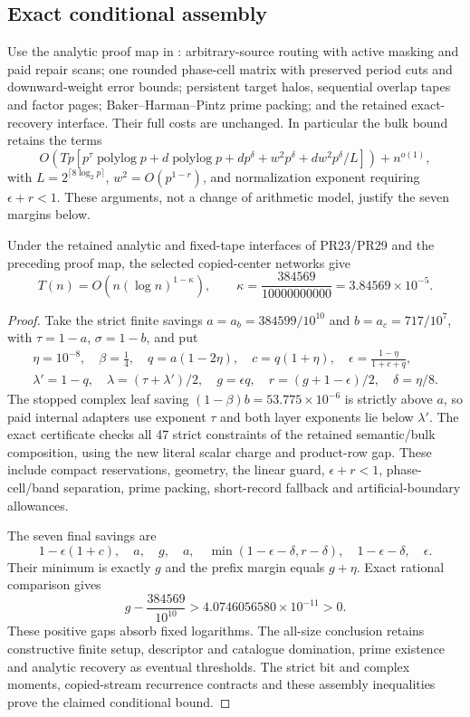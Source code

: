 \subsection{Exact conditional assembly}
Use the analytic proof map in
: arbitrary-source routing
with active masking and paid repair scans; one rounded phase-cell
matrix with preserved period cuts and downward-weight error bounds;
persistent target halos, sequential overlap tapes and factor pages;
Baker--Harman--Pintz prime packing; and the retained exact-recovery
interface. Their full costs are unchanged. In particular the bulk
bound retains the terms
\[
 O\!\left(Tp\left[p^\tau\operatorname{polylog}p+
 d\operatorname{polylog}p+dp^\delta+w^2p^\delta+
 dw^2p^\delta/L\right]\right)+n^{o(1)},
\]
with $L=2^{\lceil8\log_2p\rceil}$,
$w^2=O(p^{1-r})$, and normalization exponent requiring
$\epsilon+r<1$. These arguments, not a change of arithmetic model,
justify the seven margins below.

\begin{theorem}
Under the retained analytic and fixed-tape interfaces of PR23/PR29
and the preceding proof map, the selected copied-center networks give
\[
 T(n)=O\!\left(n(\log n)^{1-\kappa}\right),\qquad
 \boxed{\kappa=\frac{384569}{10000000000}=3.84569\times10^{-5}}.
\]
\end{theorem}
\begin{proof}
Take the strict finite savings $a=a_b=384599/10^{10}$ and
$b=a_c=717/10^7$, with $\tau=1-a$, $\sigma=1-b$, and put
\[
\begin{gathered}
 \eta=10^{-8},\quad\beta=\tfrac14,\quad q=a(1-2\eta),\quad
 c=q(1+\eta),\quad\epsilon=\frac{1-\eta}{1+c+q},\\
 \lambda'=1-q,\quad\lambda=(\tau+\lambda')/2,\quad
 g=\epsilon q,\quad r=(g+1-\epsilon)/2,\quad\delta=\eta/8.
\end{gathered}
\]
The stopped complex leaf saving $(1-\beta)b=53.775\times10^{-6}$
is strictly above $a$, so paid internal adapters use exponent $\tau$
and both layer exponents lie below $\lambda'$. The exact certificate
checks all 47 strict constraints of the retained semantic/bulk
composition, using the new literal scalar charge and product-row gap.
These include compact reservations, geometry, the linear guard,
$\epsilon+r<1$, phase-cell/band separation, prime packing, short-record
fallback and artificial-boundary allowances.

The seven final savings are
\[
 1-\epsilon(1+c),\quad a,\quad g,\quad a,\quad
 \min(1-\epsilon-\delta,r-\delta),\quad
 1-\epsilon-\delta,\quad\epsilon.
\]
Their minimum is exactly $g$ and the prefix margin equals $g+\eta$.
Exact rational comparison gives
\[
 g-\frac{384569}{10^{10}}>4.0746056580\times10^{-11}>0.
\]
These positive gaps absorb fixed logarithms. The all-size conclusion
retains constructive finite setup, descriptor and catalogue domination,
prime existence and analytic recovery as eventual thresholds. The
strict bit and complex moments, copied-stream recurrence contracts and
these assembly inequalities prove the claimed conditional bound.
\end{proof}
